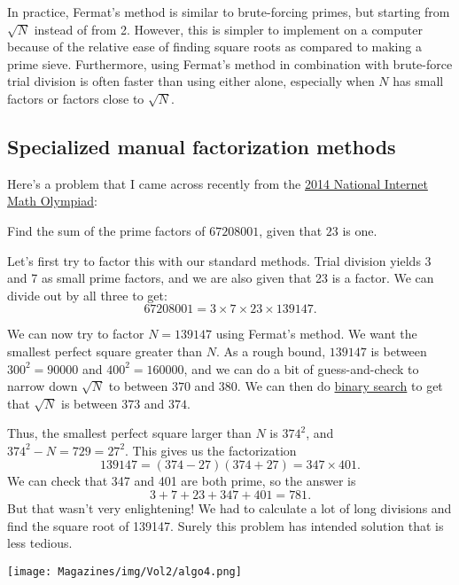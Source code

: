 \documentclass{article}
\begin{document}
\begin{multicols}{3}
In practice, Fermat's method is similar to brute-forcing primes, but starting from $\sqrt{N}$ instead of from 2. However, this is simpler to implement on a computer because of the relative ease of finding square roots as compared to making a prime sieve. Furthermore, using Fermat's method in combination with brute-force trial division is often faster than using either alone, especially when $N$ has small factors or factors close to $\sqrt{N}$.

\subsection*{Specialized manual factorization methods}

Here's a problem that I came across recently from the \href{https://artofproblemsolving.com/downloads/printable_post_collections/4092}{2014 National Internet Math Olympiad}:

\begin{center}
Find the sum of the prime factors of $67208001$, given that $23$ is one.
\end{center}

Let's first try to factor this with our standard methods. Trial division yields 3 and 7 as small prime factors, and we are also given that 23 is a factor. We can divide out by all three to get:
$$67208001 = 3 \times 7 \times 23 \times 139147.$$

We can now try to factor $N = 139147$ using Fermat's method. We want the smallest perfect square greater than $N$. As a rough bound, $139147$ is between $300^2 = 90000$ and $400^2 = 160000$, and we can do a bit of guess-and-check to narrow down $\sqrt{N}$ to between $370$ and $380$. We can then do  \href{https://en.wikipedia.org/wiki/Binary_search_algorithm}{binary search} to get that $\sqrt{N}$ is between $373$ and $374$.

Thus, the smallest perfect square larger than $N$ is $374^2$, and $374^2 - N = 729 = 27^2$. This gives us the factorization
$$139147 = (374 - 27)(374 + 27) = 347 \times 401.$$
We can check that 347 and 401 are both prime, so the answer is
$$3 + 7 + 23 + 347 + 401 = 781.$$
But that wasn't very enlightening! We had to calculate a lot of long divisions and find the square root of 139147. Surely this problem has intended solution that is less tedious.

\begin{center}
    \texttt{[image: Magazines/img/Vol2/algo4.png]}
\end{center}



\end{multicols}
\end{document}
